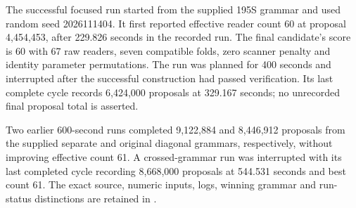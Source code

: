 The successful focused run started from the supplied 195S grammar and
used random seed 2026111404. It first reported effective reader count 60 at
proposal 4,454,453, after 229.826 seconds in the recorded run. The final
candidate's score is 60 with 67 raw readers, seven compatible folds, zero
scanner penalty and identity parameter permutations. The run was planned
for 400 seconds and interrupted after the successful construction had
passed verification. Its last complete cycle records 6,424,000 proposals
at 329.167 seconds; no unrecorded final proposal total is asserted.

Two earlier 600-second runs completed 9,122,884 and 8,446,912 proposals
from the supplied separate and original diagonal grammars, respectively,
without improving effective count 61. A crossed-grammar run was interrupted
with its last completed cycle recording 8,668,000 proposals at 544.531
seconds and best count 61. The exact source, numeric inputs, logs, winning
grammar and run-status distinctions are retained in .
